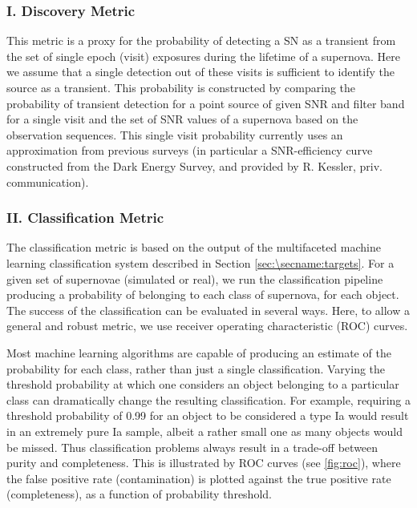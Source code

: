 \subsubsection{I. Discovery Metric}

This metric is a proxy for the probability of detecting a SN as a
transient from the set of single epoch (visit) exposures during the
lifetime of a supernova. Here we assume that a single detection out of
these visits is sufficient to identify the source as a transient. This
probability is constructed by comparing the probability of transient
detection for a point source of given SNR and filter band for a single
visit and the set of SNR values of a supernova based on the observation
sequences. This single visit probability currently uses an approximation
from previous surveys (in particular a SNR-efficiency curve constructed
from the Dark Energy Survey, and provided by R. Kessler, priv.
communication).


\subsubsection{II. Classification Metric}

The classification metric is based on the output of the multifaceted
machine learning classification system described in Section
\ref{sec:\secname:targets}. For a given set of supernovae (simulated or
real), we run the classification pipeline producing a probability of
belonging to each class of supernova, for each object. The success of
the classification can be evaluated in several ways. Here, to allow a
general and robust metric, we use receiver operating characteristic
(ROC) curves.

Most machine learning algorithms are capable of producing an estimate of
the probability for each class, rather than just a single
classification. Varying the threshold probability at which one considers
an object belonging to a particular class can dramatically change the
resulting classification. For example, requiring a threshold probability
of 0.99 for an object to be considered a type Ia would result in an
extremely pure Ia sample, albeit a rather small one as many objects
would be missed. Thus classification problems always result in a
trade-off between purity and completeness. This is illustrated by ROC
curves (see \autoref{fig:roc}), where the false positive rate
(contamination) is plotted against the true positive rate
(completeness), as a function of probability threshold.

